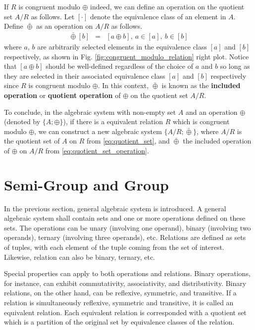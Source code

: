 If $R$ is congruent modulo $\oplus$ indeed, we can define an operation on the quotient set $A/R$ as follows. Let $[\cdot]$ denote the equivalence class of an element in $A$. Define $\bar{\oplus}$ as an operation on $A/R$ as follows.
\begin{eqnarray}
	[a] \bar{\oplus} [b] &=& [a\oplus b], ~a\in[a], ~b\in [b] \label{eq:quotient_set_operation}
\end{eqnarray}
where $a$, $b$ are arbitrarily selected elements in the equivalence class $[a]$ and $[b]$ respectively, as shown in Fig. \ref{fig:congruent_modulo_relation} right plot. Notice that $[a\oplus b]$ should be well-defined regardless of the choice of $a$ and $b$ so long as they are selected in their associated equivalence class $[a]$ and $[b]$ respectively since $R$ is congruent modulo $\oplus$. In this context, $\bar{\oplus}$ is known as the \textbf{included operation} or \textbf{quotient operation} of $\oplus$ on the quotient set $A/R$.

To conclude, in the algebraic system with non-empty set $A$ and an operation $\oplus$ (denoted by $\{A; \oplus\}$), if there is a equivalent relation $R$ which is congruent modulo $\oplus$, we can construct a new algebraic system $\{A/R; \bar{\oplus}\}$, where $A/R$ is the quotient set of $A$ on $R$ from \eqref{eq:quotient_set}, and $\bar{\oplus}$ the included operation of $\oplus$ on $A/R$ from \eqref{eq:quotient_set_operation}.

\section{Semi-Group and Group}

In the previous section, general algebraic system is introduced. A general algebraic system shall contain sets and one or more operations defined on these sets. The operations can be unary (involving one operand), binary (involving two operands), ternary (involving three operands), etc. Relations are defined as sets of tuples, with each element of the tuple coming from the set of interest. Likewise, relation can also be binary, ternary, etc.

Special properties can apply to both operations and relations. Binary operations, for instance, can exhibit commutativity, associativity, and distributivity. Binary relations, on the other hand, can be reflexive, symmetric, and transitive.  If a relation is simultaneously reflexive, symmetric and transitive, it is called an equivalent relation. Each equivalent relation is corresponded with a quotient set which is a partition of the original set by equivalence classes of the relation.


